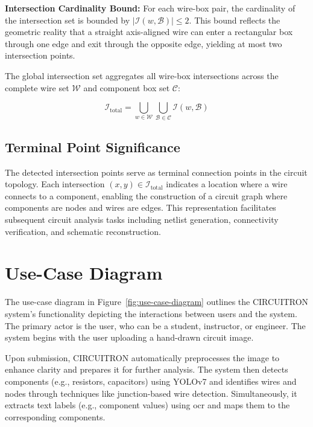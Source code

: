 \textbf{Intersection Cardinality Bound:} For each wire-box pair, the cardinality of the intersection set is bounded by $|\mathcal{I}(w, \mathcal{B})| \le 2$. This bound reflects the geometric reality that a straight axis-aligned wire can enter a rectangular box through one edge and exit through the opposite edge, yielding at most two intersection points.

The global intersection set aggregates all wire-box intersections across the complete wire set $\mathcal{W}$ and component box set $\mathcal{C}$:

\begin{equation}
\mathcal{I}_{\text{total}} = \bigcup_{w \in \mathcal{W}} \bigcup_{\mathcal{B} \in \mathcal{C}} \mathcal{I}(w, \mathcal{B})
\label{eq:global-intersection-set}
\end{equation}

\subsection{Terminal Point Significance}

The detected intersection points serve as terminal connection points in the circuit topology. Each intersection $(x, y) \in \mathcal{I}_{\text{total}}$ indicates a location where a wire connects to a component, enabling the construction of a circuit graph where components are nodes and wires are edges. This representation facilitates subsequent circuit analysis tasks including netlist generation, connectivity verification, and schematic reconstruction.

\section{Use-Case Diagram}

The use-case diagram in Figure~\ref{fig:use-case-diagram} outlines the CIRCUITRON system's functionality depicting the interactions between users and the system. The primary actor is the user, who can be a student, instructor, or engineer. The system begins with the user uploading a hand-drawn circuit image.

Upon submission, CIRCUITRON automatically preprocesses the image to enhance clarity and prepares it for further analysis. The system then detects components (e.g., resistors, capacitors) using YOLOv7 and identifies wires and nodes through techniques like junction-based wire detection. Simultaneously, it extracts text labels (e.g., component values) using \gls{ocr} and maps them to the corresponding components.

